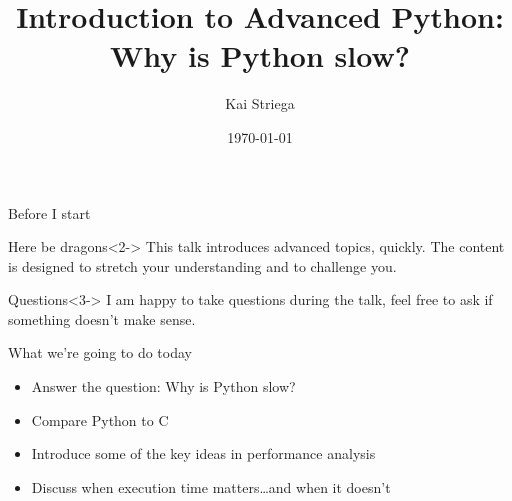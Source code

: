 \documentclass[12pt, aspectration=169]{beamer}
\title{Introduction to Advanced Python:\\Why is Python slow?}
\author{Kai Striega}
\date{\today}
\begin{document}
    \maketitle

    \begin{frame}{Before I start}
        \begin{block}{Here be dragons}<2->
            This talk introduces advanced topics, quickly.
            The content is designed to stretch your understanding and to challenge you.
        \end{block}
        \begin{block}{Questions}<3->
            I am happy to take questions during the talk, feel free to ask if something doesn't make sense.
        \end{block}
    \end{frame}

    \begin{frame}{What we're going to do today}
        \begin{itemize}
            \item Answer the question: Why is Python slow?
            \item Compare Python to C
            \item Introduce some of the key ideas in performance analysis
            \item Discuss when execution time matters\ldots and when it doesn't
        \end{itemize}
    \end{frame}
\end{document}
